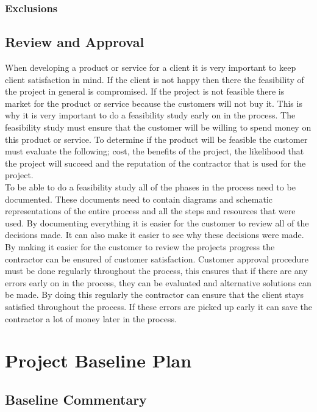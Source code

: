 \subsubsection{Exclusions}

\newpage
\subsection{Review and Approval} 

When developing a product or service for a client it is very important to keep client satisfaction in mind. If the client is not happy then there the feasibility of the project in general is compromised. If the project is not feasible there is market for the product or service because the customers will not buy it. This is why it is very important to do a feasibility study early on in the process. The feasibility study must ensure that the customer will be willing to spend money on this product or service. To determine if the product will be feasible the customer must evaluate the following; cost, the benefits of the project, the likelihood that the project will succeed and the reputation of the contractor that is used for the project.\\

\noindent
To be able to do a feasibility study all of the phases in the process need to be documented. These documents need to contain diagrams and schematic representations of the entire process and all the steps and resources that were used. By documenting everything it is easier for the customer to review all of the decisions made. It can also make it easier to see why these decisions were made. By making it easier for the customer to review the projects progress the contractor can be ensured of customer satisfaction. Customer approval procedure must be done regularly throughout the process, this ensures that if there are any errors early on in the process, they can be evaluated and alternative solutions can be made. By doing this regularly the contractor can ensure that the client stays satisfied throughout the process. If these errors are picked up early it can save the contractor a lot of money later in the process.

\newpage
\section{Project Baseline Plan}
\subsection{Baseline Commentary}

